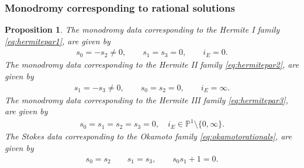 \documentclass[pdftex]{sigma}
\numberwithin{equation}{section}
\newtheorem{pro}[thm]{Proposition}
\begin{document}
\subsubsection{Monodromy corresponding to rational solutions}\label{section:monodromyrational}
\begin{pro}\label{prop:rationalmonodromy}
	The monodromy data corresponding to the Hermite I family \eqref{eq:hermitepar1}, are given by
	\begin{gather}\label{eq:monodromydataHI}
	s_0=-s_2\neq 0,\qquad s_1=s_3=0,\qquad i_E=0.
	\end{gather}
	The monodromy data corresponding to the Hermite II family \eqref{eq:hermitepar2}, are given by
	\begin{gather*}
	s_1=-s_3\neq 0,\qquad s_0=s_2=0,\qquad i_E=\infty.
	\end{gather*}
	The monodromy data corresponding to the Hermite III family \eqref{eq:hermitepar3}, are given by
	\begin{gather*}
	s_0=s_1=s_2=s_3=0,\quad i_E\in\mathbb{P}^1\setminus\{0,\infty\}.
	\end{gather*}
	The Stokes data corresponding to the Okamoto family \eqref{eq:okamotorationals}, are given by
	\begin{gather*}
	s_0=s_2\qquad s_1=s_3,\qquad s_0s_1+1=0.
	\end{gather*}
\end{pro}
\end{document}
